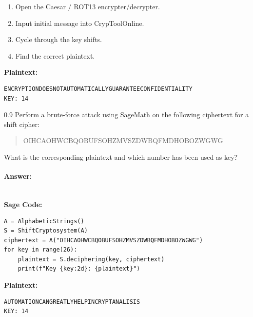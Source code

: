 \documentclass[]{scrartcl}
\newcounter{exercise}
\newcounter{qid}[section]
\newcommand{\exerciseprefix}{prefix}
\newcommand{\questiontitle}{Questions}
\newcommand{\blockid}{B2}
\newcommand{\exname}{}
\begin{document}
\bigskip
\begin{enumerate}
    \item Open the Caesar / ROT13 encrypter/decrypter.
    \item Input initial message into CrypToolOnline.
    \item Cycle through the key shifts.
    \item Find the correct plaintext.
\end{enumerate}

\noindent\textbf{Plaintext:}
\begin{lstlisting}[style=plusStyle, basicstyle=\tiny\ttfamily]
ENCRYPTIONDOESNOTAUTOMATICALLYGUARANTEECONFIDENTIALITY                                   KEY: 14
\end{lstlisting}

\bigskip
\newcommand{\ciphertwo}{OIHCAOHWCBQOBUFSOHZMVSZDWBQFMDHOBOZWGWG}
\renewcommand{\exerciseprefix}{PS-\blockid{}-E\theexercise: \exname{}-Q\theqid}
\renewcommand{\questiontitle}{\exerciseprefix{}: Brute-force attack on shift cipher (II/II)}
\begin{exercisebox}{0.9}
Perform a brute-force attack using SageMath on the following ciphertext for a shift cipher:
\begin{quote}
    \ciphertwo{}
\end{quote}
What is the corresponding plaintext and which number has been used as key?
\end{exercisebox}
\bigskip
\paragraph{Answer:} \mbox{} \\

\noindent\textbf{Sage Code:}
\begin{lstlisting}[style=plusStyle, basicstyle=\tiny\ttfamily, breaklines=true]
A = AlphabeticStrings()
S = ShiftCryptosystem(A)
ciphertext = A("OIHCAOHWCBQOBUFSOHZMVSZDWBQFMDHOBOZWGWG")
for key in range(26):
    plaintext = S.deciphering(key, ciphertext)
    print(f"Key {key:2d}: {plaintext}")
\end{lstlisting}

\noindent\textbf{Plaintext:}
\begin{lstlisting}[style=plusStyle, basicstyle=\tiny\ttfamily]
AUTOMATIONCANGREATLYHELPINCRYPTANALISIS                                                  KEY: 14
\end{lstlisting}
\end{document}
